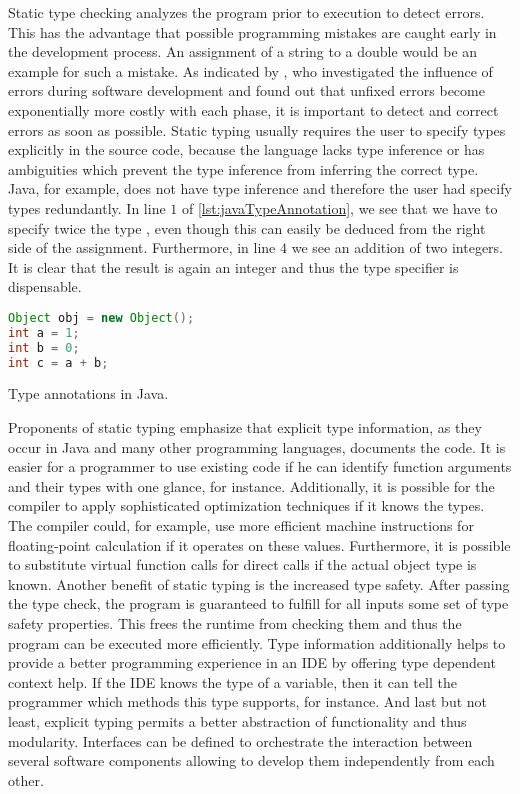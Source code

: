 Static type checking analyzes the program prior to execution to detect errors.
This has the advantage that possible programming mistakes are caught early in the development process.
An assignment of a string to a double would be an example for such a mistake.
As indicated by \cite{westland:jss2002a}, who investigated the influence of errors during software development and found out that unfixed errors become exponentially more costly with each phase, it is important to detect and correct errors as soon as possible.
Static typing usually requires the user to specify types explicitly in the source code, because the language lacks type inference or has ambiguities which prevent the type inference from inferring the correct type.
Java, for example, does not have type inference and therefore the user had specify types redundantly.
In line $1$ of \cref{lst:javaTypeAnnotation}, we see that we have to specify twice the type , even though this can easily be deduced from the right side of the assignment.
Furthermore, in line $4$ we see an addition of two integers.
It is clear that the result is again an integer and thus the  type specifier is dispensable.
\begin{listing}[!h]
	\begin{CenteredBox}
		\begin{lstlisting}[language=Java]
Object obj = new Object();
int a = 1;
int b = 0;
int c = a + b;			
		\end{lstlisting}
	\end{CenteredBox}
	\caption{Type annotations in Java.}
	\label{lst:javaTypeAnnotation}
\end{listing}

Proponents of static typing emphasize that explicit type information, as they occur in Java and many other programming languages, documents the code.
It is easier for a programmer to use existing code if he can identify function arguments and their types with one glance, for instance. 
Additionally, it is possible for the compiler to apply sophisticated optimization techniques if it knows the types.
The compiler could, for example, use more efficient machine instructions for floating-point calculation if it operates on these values.
Furthermore, it is possible to substitute virtual function calls for direct calls if the actual object type is known.
Another benefit of static typing is the increased type safety.
After passing the type check, the program is guaranteed to fulfill for all inputs some set of type safety properties.
This frees the runtime from checking them and thus the program can be executed more efficiently.
Type information additionally helps to provide a better programming experience in an IDE by offering type dependent context help.
If the IDE knows the type of a variable, then it can tell the programmer which methods this type supports, for instance.
And last but not least, explicit typing permits a better abstraction of functionality and thus modularity.
Interfaces can be defined to orchestrate the interaction between several software components allowing to develop them independently from each other.

